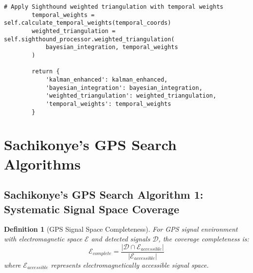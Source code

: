 \documentclass[12pt,a4paper]{article}
\newtheorem{definition}{Definition}
\begin{document}
\begin{lstlisting}[style=pythonstyle, caption=Temporal Multi-Path Analysis for GPS Enhancement]
        # Apply Sighthound weighted triangulation with temporal weights
        temporal_weights = self.calculate_temporal_weights(temporal_coords)
        weighted_triangulation = self.sighthound_processor.weighted_triangulation(
            bayesian_integration, temporal_weights
        )
        
        return {
            'kalman_enhanced': kalman_enhanced,
            'bayesian_integration': bayesian_integration,
            'weighted_triangulation': weighted_triangulation,
            'temporal_weights': temporal_weights
        }
\end{lstlisting}

\section{Sachikonye's GPS Search Algorithms}

\subsection{Sachikonye's GPS Search Algorithm 1: Systematic Signal Space Coverage}

\begin{definition}[GPS Signal Space Completeness]
For GPS signal environment with electromagnetic space $\mathcal{E}$ and detected signals $\mathcal{D}$, the coverage completeness is:
\begin{equation}
\mathcal{E}_{complete} = \frac{|\mathcal{D} \cap \mathcal{E}_{accessible}|}{|\mathcal{E}_{accessible}|}
\end{equation}
where $\mathcal{E}_{accessible}$ represents electromagnetically accessible signal space.
\end{definition}
\end{document}
